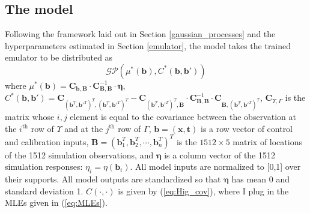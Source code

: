 \documentclass{article}
\begin{document}
\subsection{The model}
Following the framework laid out in Section \ref{gaussian_processes} and the hyperparameters estimated in Section \ref{emulator}, the model takes the trained emulator to be distributed as
\begin{equation}\label{posterior_GP}
\mathcal {GP}\left(\mu^*(\mathbf b), C^*(\mathbf b,\mathbf b')\right)
\end{equation}
where $\mu^*(\mathbf b) = \mathbf C_{\mathbf b,\mathbf B} \cdot \mathbf C_{\mathbf B,\mathbf B}^{-1} \cdot \boldsymbol \eta$, $C^*(\mathbf b,\mathbf b') = \mathbf C_{(\mathbf b^T,\mathbf b'^T)^T,(\mathbf b^T,\mathbf b'^T)^T} - \mathbf C_{(\mathbf b^T,\mathbf b'^T)^T,\mathbf B}\cdot \mathbf C_{\mathbf B,\mathbf B}^{-1} \cdot \mathbf C_{\mathbf B,(\mathbf b^T,\mathbf b'^T)^T}$, $\mathbf C_{\Upsilon,\Gamma}$ is the matrix whose $i,j$ element is equal to the covariance between the observation at the $i^{\text{th}}$ row of $\Upsilon$ and at the $j^{\text{th}}$ row of $\Gamma$, $\mathbf b=(\mathbf x,\mathbf t)$ is a row vector of control and calibration inputs, $\mathbf B=(\mathbf b_1^T,\mathbf b_2^T,\cdots,\mathbf b_n^T)^T$ is the $1512\times5$ matrix of locations of the 1512 simulation observations, and $\boldsymbol\eta$ is a column vector of the 1512 simulation responses: $\eta_i=\eta(\mathbf b_i)$. All model inputs are normalized to [0,1] over their supports. All model outputs are standardized so that $\boldsymbol\eta$ has mean 0 and standard deviation 1.
$C(\cdot,\cdot)$ is given by (\ref{eq:Hig_cov}), where I plug in the MLEs given in (\ref{eq:MLEs}). 
\end{document}
